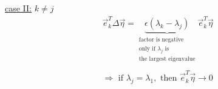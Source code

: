 \underline{case II:} $k \neq j$
\begin{equation}
	\begin{array}{l}
	\vec{e}_k^T \Delta \vec{\eta} = 
	\underbrace{ \epsilon (\lambda_k - \lambda_j) }_{
		\substack{\text{factor is negative} \\
			\text{only if } \lambda_j \text{ is} \\
			\text{the largest eigenvalue}}} 
		\vec{e}_k^T \vec{\eta} \\\\
	\Rightarrow \text{ if } \lambda_j = \lambda_1, \text{ then }
		\vec{e}_k^T \vec{\eta} \rightarrow 0
	\end{array}
\end{equation}
